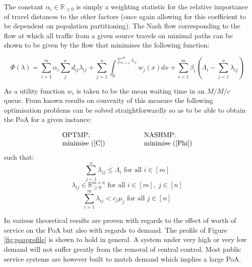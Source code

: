 \documentclass[a4paper,11pt]{article}
\begin{document}
The constant $\alpha_i\in\mathbb{R}_{\geq0}$ is simply a weighting statistic for the relative importance of travel distances to the other factors (once again allowing for this coefficient to be dependent on population partitioning).
The Nash flow corresponding to the flow at which all traffic from a given source travels on minimal paths can be shown to be given by the flow that minimises the following function:

\begin{equation}
\Phi(\lambda)=\sum_{i=1}^m\alpha_i\sum_{j}^nd_{ij}\lambda_{ij}+\sum_{j=1}^n\int_0^{\sum_{i=1}^m\lambda_{ij}}w_j(x)dx+\sum_{i=1}^m\beta_i\left(\Lambda_i-\sum_{j=1}^n\lambda_{ij}\right)
\label{Phi}\end{equation}

As a utility function $w_i$ is taken to be the mean waiting time in an $M/M/c$ queue.
From known results on convexity of this measure \cite{lee_note_1983} the following optimisation problems can be solved straightforwardly so as to be able to obtain the PoA for a given instance:

$$\begin{array}{l@{\hspace{2cm}}l}\text{OPTMP:}&\text{NASHMP:}\\
\text{minimise }(\ref{C})&\text{minimise }(\ref{Phi})
\end{array}$$
such that:
\begin{equation}
\sum_{j=1}^n\lambda_{ij}\leq\Lambda_{i}\text{ for all }i\in[m]\label{constraint 1}
\end{equation}
\begin{equation}
\lambda_{ij}\in\mathbb{R}^{m\times n}_{\geq 0}\text{ for all }i\in[m],\;j\in[n]\label{constraint 2}
\end{equation}
\begin{equation}
\sum_{i=1}^m\lambda_{ij}<c_j\mu_j\text{ for all }j\in[n]\label{constraint 3}
\end{equation}

In \cite{Knight2013} various theoretical results are proven with regards to the effect of worth of service on the PoA but also with regards to demand.
The profile of Figure \ref{fig:poaprofile} is shown to hold in general.
A system under very high or very low demand will not suffer greatly from the removal of central control.
Most public service systems are however built to match demand which implies a large PoA.
\end{document}
